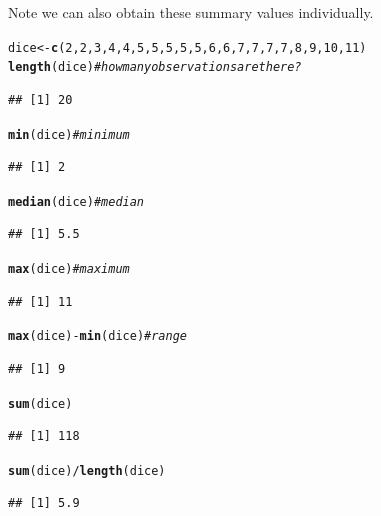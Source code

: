 \documentclass[12pt]{article}\usepackage[]{graphicx}\usepackage[]{color}
\makeatletter
\newcommand{\hlnum}[1]{\textcolor[rgb]{0.686,0.059,0.569}{#1}}%
\newcommand{\hlcom}[1]{\textcolor[rgb]{0.678,0.584,0.686}{\textit{#1}}}%
\newcommand{\hlopt}[1]{\textcolor[rgb]{0,0,0}{#1}}%
\newcommand{\hlstd}[1]{\textcolor[rgb]{0.345,0.345,0.345}{#1}}%
\newcommand{\hlkwb}[1]{\textcolor[rgb]{0.69,0.353,0.396}{#1}}%
\newcommand{\hlkwd}[1]{\textcolor[rgb]{0.737,0.353,0.396}{\textbf{#1}}}%
\newenvironment{kframe}{%
 \def\at@end@of@kframe{}%
 \ifinner\ifhmode%
  \def\at@end@of@kframe{\end{minipage}}%
  \begin{minipage}{\columnwidth}%
 \fi\fi%
 \def\FrameCommand##1{\hskip\@totalleftmargin \hskip-\fboxsep
 \colorbox{shadecolor}{##1}\hskip-\fboxsep
     \hskip-\linewidth \hskip-\@totalleftmargin \hskip\columnwidth}%
 \MakeFramed {\advance\hsize-\width
   \@totalleftmargin\z@ \linewidth\hsize
   \@setminipage}}%
 {\par\unskip\endMakeFramed%
 \at@end@of@kframe}
\newenvironment{knitrout}{}{} %
\makeatother
\begin{document}
Note we can also obtain these summary values individually.
\begin{knitrout}
\color{fgcolor}\begin{kframe}
\begin{alltt}
\hlstd{dice} \hlkwb{<-} \hlkwd{c}\hlstd{(}\hlnum{2}\hlstd{,}\hlnum{2}\hlstd{,}\hlnum{3}\hlstd{,}\hlnum{4}\hlstd{,}\hlnum{4}\hlstd{,}\hlnum{5}\hlstd{,}\hlnum{5}\hlstd{,}\hlnum{5}\hlstd{,}\hlnum{5}\hlstd{,}\hlnum{5}\hlstd{,}\hlnum{6}\hlstd{,}\hlnum{6}\hlstd{,}\hlnum{7}\hlstd{,}\hlnum{7}\hlstd{,}\hlnum{7}\hlstd{,}\hlnum{7}\hlstd{,}\hlnum{8}\hlstd{,}\hlnum{9}\hlstd{,}\hlnum{10}\hlstd{,}\hlnum{11}\hlstd{)}
\hlkwd{length}\hlstd{(dice)} \hlcom{#how many observations are there?}
\end{alltt}
\begin{verbatim}
## [1] 20
\end{verbatim}
\begin{alltt}
\hlkwd{min}\hlstd{(dice)} \hlcom{#minimum}
\end{alltt}
\begin{verbatim}
## [1] 2
\end{verbatim}
\begin{alltt}
\hlkwd{median}\hlstd{(dice)} \hlcom{#median}
\end{alltt}
\begin{verbatim}
## [1] 5.5
\end{verbatim}
\begin{alltt}
\hlkwd{max}\hlstd{(dice)} \hlcom{#maximum}
\end{alltt}
\begin{verbatim}
## [1] 11
\end{verbatim}
\begin{alltt}
\hlkwd{max}\hlstd{(dice)}\hlopt{-}\hlkwd{min}\hlstd{(dice)} \hlcom{#range}
\end{alltt}
\begin{verbatim}
## [1] 9
\end{verbatim}
\begin{alltt}
\hlkwd{sum}\hlstd{(dice)}
\end{alltt}
\begin{verbatim}
## [1] 118
\end{verbatim}
\begin{alltt}
\hlkwd{sum}\hlstd{(dice)}\hlopt{/}\hlkwd{length}\hlstd{(dice)}
\end{alltt}
\begin{verbatim}
## [1] 5.9
\end{verbatim}

\end{kframe}
\end{knitrout}
\end{document}
